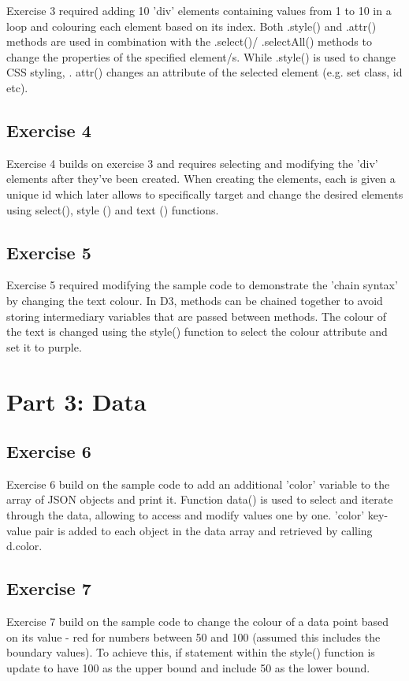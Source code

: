 \documentclass[11pt]{article}   	%
\begin{document}
Exercise 3 required adding 10 'div' elements containing values from 1 to 10 in a loop and colouring each element based on its index. 
Both .style() and .attr() methods are used in combination with the .select()/ .selectAll() methods to change the properties of the specified element/s. While .style() is used to change CSS styling, . attr() changes an attribute of the selected element (e.g. set class, id etc).

\subsection{Exercise 4 }
\vspace{-1em}
Exercise 4 builds on exercise 3 and requires selecting and modifying the 'div' elements after they've been created. When creating the elements, each is given a unique id which later allows to specifically target and change the desired elements using select(), style () and text () functions.  

\subsection{Exercise 5 }
\vspace{-1em}
Exercise 5 required modifying the sample code to demonstrate the 'chain syntax' by changing the text colour.
In D3, methods can be chained together to avoid storing intermediary variables that are passed between methods. The colour of the text is changed using the style() function to select the colour attribute and set it to purple.


\section{Part 3: Data}
\subsection{Exercise 6 }
\vspace{-1em}
Exercise 6 build on the sample code to add an additional 'color' variable to the array of JSON objects and print it.
Function data() is used to select and iterate through the data, allowing to access and modify values one by one. 'color' key-value pair is added to each object in the data array and retrieved by calling d.color.

\subsection{Exercise 7 }
\vspace{-1em}
Exercise 7 build on the sample code to change the colour of a data point based on its value - red for numbers between 50 and 100 (assumed this includes the boundary values). To achieve this, if statement within the style() function is update to have 100 as the upper bound and include 50 as the lower bound.
\end{document}
